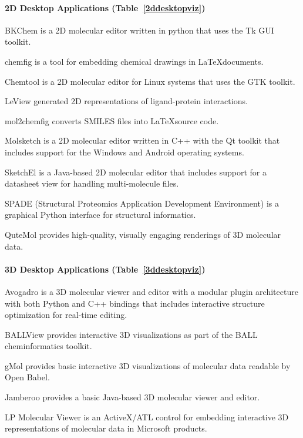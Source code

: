 \paragraph{2D Desktop Applications (Table~\ref{2ddesktopviz})}

BKChem is a 2D molecular editor written in python that uses the Tk GUI toolkit.

chemfig is a tool for embedding chemical drawings in \LaTeX documents.

Chemtool is a 2D molecular editor for Linux systems that uses the GTK toolkit.

LeView \cite{Caboche_2013} generated 2D representations of ligand-protein interactions.

mol2chemfig \cite{Brefo_Mensah_2012} converts SMILES files into \LaTeX source code.

Molsketch is a 2D molecular editor written in C++ with the Qt toolkit that includes support for the Windows and Android operating systems.

SketchEl is a Java-based 2D molecular editor that includes support for a datasheet view for handling multi-molecule files.

SPADE (Structural Proteomics Application Development Environment) \cite{sweeney2011computational} is a graphical Python interface for structural informatics.

QuteMol \cite{Tarini_2006} provides high-quality, visually engaging renderings of 3D molecular data.


\paragraph{3D Desktop Applications (Table~\ref{3ddesktopviz})}

Avogadro \cite{Hanwell_2012} is a 3D molecular viewer and editor with a modular plugin architecture with both Python and C++ bindings that includes interactive structure optimization for real-time editing. 

BALLView \cite{Moll_2005} provides interactive 3D visualizations as part of the BALL \cite{Hildebrandt_2010} cheminformatics toolkit.

gMol provides basic interactive 3D visualizations of molecular data readable by Open Babel.

Jamberoo provides a basic Java-based 3D molecular viewer and editor.

LP Molecular Viewer is an ActiveX/ATL control for embedding interactive 3D representations of molecular data in Microsoft products.


